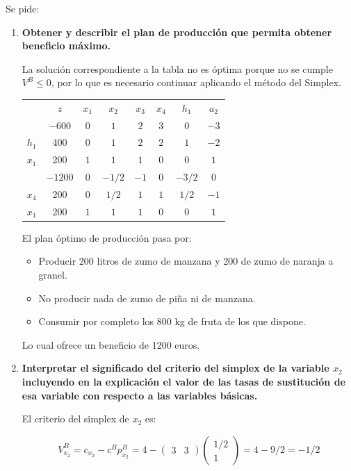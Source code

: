 Se pide:

\begin{enumerate}[label=\alph*)]
    \item \textbf{Obtener y describir el plan de producción que permita obtener beneficio máximo.}

    La solución correspondiente a la tabla no es óptima porque no se cumple $V^B\leq 0$, por lo que es necesario continuar aplicando el método del Simplex.


         \begin{center}
        \begin{tabular}{c|c|cccccc|}
         & $z$ & $x_1$ & $x_2$ & $x_3$ & $x_4$ & $h_1$ & $a_2$\\ 
         & $-600$ & $0$ & $1$ & $2$ & $3$ & $0$ & $-3$ \\ 
        \hline
        $h_1$ & 400  & $0$ & $1$ & $2$ & $2$ & $1$ & $-2$\\ 
        $x_1$ & 200  & $1$ & $1$ & $1$ & $0$ & $0$ & $1$\\ 
        \hline
         & $-1200$ & $0$ & $-1/2$ & $-1$ & $0$ & $-3/2$ & $0$ \\ 
        \hline
        $x_4$ & 200  & $0$ & $1/2$ & $1$ & $1$ & $1/2$ & $-1$\\ 
        $x_1$ & 200  & $1$ & $1$ & $1$ & $0$ & $0$ & $1$\\ 
        \hline
        \end{tabular}
        \end{center}

    El plan óptimo de producción pasa por:
    \begin{itemize}
        \item Producir 200 litros de zumo de manzana y 200 de zumo de naranja a granel.
        \item No producir nada de zumo de piña ni de manzana.
        \item Consumir por completo los 800 kg de fruta de los que dispone.
    \end{itemize}
    Lo cual ofrece un beneficio de 1200 euros.

    \item \textbf{Interpretar el significado del criterio del simplex de la variable $x_2$ incluyendo en la explicación el valor de las tasas de sustitución de esa variable con respecto a las variables básicas.}

    El criterio del simplex de $x_2$ es:

    \[
    V^B_{x_2} = c_{x_2}-c^Bp^B_{x_2} = 
    4 -
    \begin{pmatrix}
        3 & 3
    \end{pmatrix}
    \begin{pmatrix}
        1/2 \\
        1
    \end{pmatrix}
    = 4 - 9/2=-1/2
    \]


\end{enumerate}

